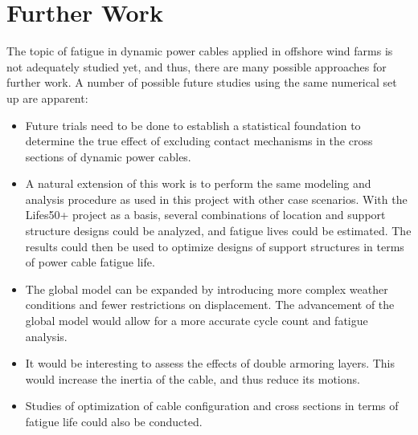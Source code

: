\section{Further Work}
The topic of fatigue in dynamic power cables applied in offshore wind farms is not adequately studied yet, and thus, there are many possible approaches for further work. A number of possible future studies using the same numerical set up are apparent: 
\begin{itemize}
    \item Future trials need to be done to establish a statistical foundation to determine the true effect of excluding contact mechanisms in the cross sections of dynamic power cables.  
    \item A natural extension of this work is to perform the same modeling and analysis procedure as used in this project with other case scenarios. With the Lifes50+ project as a basis, several combinations of location and support structure designs could be analyzed, and fatigue lives could be estimated. The results could then be used to optimize designs of support structures in terms of power cable fatigue life.  
    \item The global model can be expanded by introducing more complex weather conditions and fewer restrictions on displacement. The advancement of the global model would allow for a more accurate cycle count and fatigue analysis.  
    \item It would be interesting to assess the effects of double armoring layers. This would increase the inertia of the cable, and thus reduce its motions.
    \item Studies of optimization of cable configuration and cross sections in terms of fatigue life could also be conducted. 
\end{itemize}

  